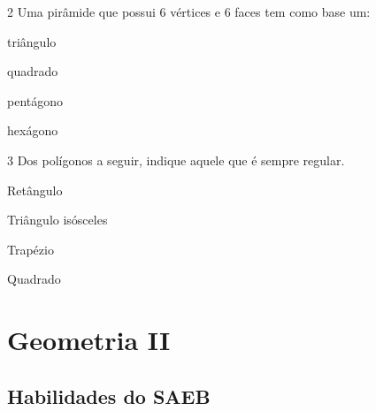 \pagebreak
\num{2} Uma pirâmide que possui 6 vértices e 6 faces tem como base um:

\begin{escolha}
  \item triângulo

  \item quadrado

  \item pentágono

  \item hexágono
\end{escolha}


\num{3} Dos polígonos a seguir, indique aquele que é sempre regular.

\begin{escolha}
  \item Retângulo

  \item Triângulo isósceles

  \item Trapézio

  \item Quadrado
\end{escolha}

\chapter{Geometria II}

\section{Habilidades do SAEB}

